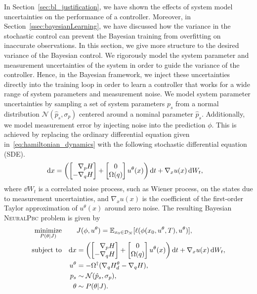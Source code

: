 In Section~\ref{sec:bl_justification}, we have shown the effects of system model
uncertainties on the performance of a controller.
%
Moreover, in Section~\ref{ssec:bayesianLearning}, we have discussed how the
variance in the stochastic control can prevent the Bayesian training from
overfitting on inaccurate observations.
%
In this section, we give more structure to the desired variance of the Bayesian
control.
%
We rigorously model the system parameter and measurement uncertainties of the
system in order to guide the variance of the controller.
%
Hence, in the Bayesian framework, we inject these uncertainties directly into
the training loop in order to learn a controller that works for a wide range of
system parameters and measurement noise.
%
We model system parameter uncertainties by sampling a set of system parameters
$p_s$ from a normal distribution $\mathcal{N}(\hat{p}_s, \sigma_p)$ centered
around a nominal parameter $\hat{p}_s$.
%
Additionally, we model measurement error by injecting noise into the prediction
$\phi$.
%
This is achieved by replacing the ordinary differential equation given
in~\eqref{eq:hamiltonian_dynamics} with the following stochastic differential
equation (SDE).
\begin{align}
    \operatorname{d}\! x &= \left(\begin{bmatrix}\phantom{-}\nabla_p H \\-\nabla_q H\end{bmatrix} + \begin{bmatrix}0 \\ \Omega(q)\end{bmatrix}u^{\theta}(x) \right) \operatorname{d}\! t + \nabla_x u(x) \operatorname{d}\! W_t, 
    \label{eq:sde_initial}
\end{align}
where $\dd W_t$ is a correlated noise process, such as Wiener process, on the
states due to measurement uncertainties, and $\nabla_x u(x)$ is the coefficient
of the first-order Taylor approximation of $u^{\theta}(x)$ around zero noise. 
The resulting Bayesian \textsc{NeuralPbc} problem is given by
\begin{equation}
    \begin{aligned}
        \underset{P(\theta | J)}{\textrm{minimize}} 
        & & & J(\phi, u^\theta) = \mathbb{E}_{x_0 \in \mathcal{D}_N}[\ell(\phi(x_0, u^\theta, T), u^\theta) ]  , \\
        \textrm{subject to}
        & & \operatorname{d}\! x &= \left(\begin{bmatrix}\phantom{-}\nabla_p H \\-\nabla_q H\end{bmatrix} + \begin{bmatrix}0 \\ \Omega(q)\end{bmatrix}u^{\theta}(x) \right) \operatorname{d}\! t + \nabla_x u(x) \operatorname{d}\! W_t, \\
        & & u^{\theta} &= -\Omega^{\dagger} (\nabla_q H_d^{\theta} - \nabla_q H), \\
        & & p_s &\sim \mathcal{N}(\hat{p}_s, \sigma_p), \\
        & & \theta &\sim P(\theta | J).
    \end{aligned}
    \label{eq:smooth_bayesian_pbc}
\end{equation}

